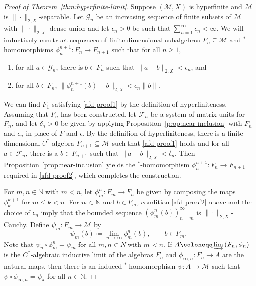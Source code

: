 \documentclass[a4paper,11pt]{amsart}
\theoremstyle{definition}
\numberwithin{equation}{section}
\numberwithin{theorem}{section}
\newcommand{\M}{\mathcal{M}}
\begin{document}
\begin{proof}[Proof of Theorem~\ref{thm:hyperfinite-limit}]
	Suppose $(\M, X)$ is hyperfinite and $\M$ is $\|\cdot\|_{2, X}$-separable. Let $\mathcal G_n$ be an increasing sequence of finite subsets of $\M$ with $\|\cdot\|_{2, X}$-dense union and let $\epsilon_n > 0$ be such that $\sum_{n=1}^\infty \epsilon_n < \infty$.  We will inductively construct sequences of finite dimensional subalgebras $F_n \subseteq \M$ and $^*$-homomorphisms $\phi_n^{n+1} \colon F_n \rightarrow F_{n+1}$ such that for all $n \geq 1$,
	\begin{enumerate}
		\item\label{afd-proof1} for all $a \in \mathcal G_n$, there is $b \in F_n$ such that $\|a - b\|_{2, X} < \epsilon_n$, and
		\item\label{afd-proof2} for all $b \in F_n$, $\|\phi_n^{n+1}(b) - b\|_{2, X} < \epsilon_n \|b\|$.
	\end{enumerate}
	
	We can find $F_1$ satisfying \ref{afd-proof1} by the definition of hyperfiniteness.  Assuming that $F_n$ has been constructed, let $\mathcal F_n$ be a system of matrix units for $F_n$, and let $\delta_n > 0$ be given by applying Proposition~\ref{prop:near-inclusion} with $F_n$ and $\epsilon_n$ in place of $F$ and $\epsilon$. By the definition of hyperfiniteness, there is a finite dimensional $C^*$-algebra $F_{n+1} \subseteq \M$ such that \ref{afd-proof1} holds and for all $a \in \mathcal F_n$, there is a $b \in F_{n+1}$ such that $\|a - b\|_{2, X} < \delta_n$.  Then Proposition~\ref{prop:near-inclusion} yields the $^*$-homomorphism $\phi_n^{n+1} \colon F_n \rightarrow F_{n+1}$ required in \ref{afd-proof2}, which completes the construction.
	
	For $m, n \in \mathbb N$ with $m < n$, let $\phi_m^n \colon F_m \rightarrow F_n$ be given by composing the maps $\phi_k^{k+1}$ for $m \leq k < n$.  For $m \in \mathbb N$ and $b \in F_m$, condition \ref{afd-proof2} above and the choice of $\epsilon_n$ imply that the bounded sequence $(\phi_m^n(b))_{n=m}^\infty$ is $\|\cdot\|_{2, X}$-Cauchy.  Define $\psi_m \colon F_m \rightarrow \M$ by
	\begin{equation}
		\psi_m(b) \coloneqq \lim_{n\rightarrow \infty}
		\phi_m^n(b), \qquad b \in F_m.
	\end{equation}
	Note that $\psi_n \circ\phi_m^n = \psi_m$ for all $m, n \in N$ with $m < n$.  If \mbox{$A \coloneqq \varinjlim \,(F_n, \phi_n)$} is the $C^*$-algebraic inductive limit of the algebras $F_n$ and \mbox{$\phi_{\infty, n} \colon F_n \rightarrow A$} are the natural maps, then there is an induced $^*$-homomorphism $\psi \colon A \rightarrow \M$ such that $\psi \circ \phi_{\infty, n} = \psi_n$ for all $n \in \mathbb N$.
	

\end{proof}
\end{document}
